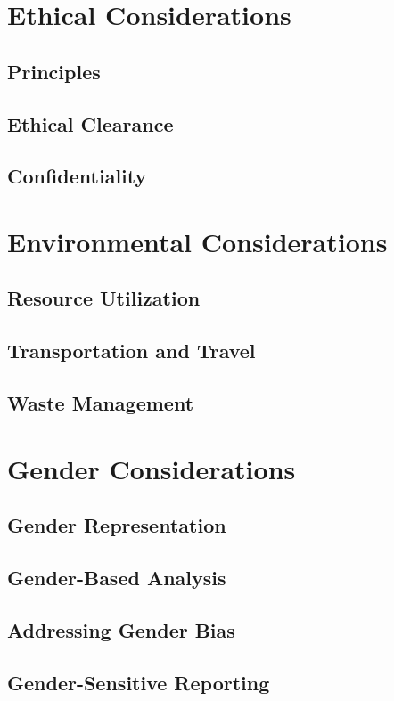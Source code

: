\section{Ethical Considerations}

\subsection*{Principles}

\subsection*{Ethical Clearance}

\subsection*{Confidentiality}

\section{Environmental Considerations}

\subsection*{Resource Utilization}

\subsection*{Transportation and Travel}

\subsection*{Waste Management}

\section{Gender Considerations}

\subsection*{Gender Representation}

\subsection*{Gender-Based Analysis}

\subsection*{Addressing Gender Bias}

\subsection*{Gender-Sensitive Reporting}
